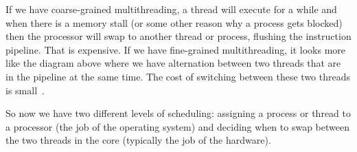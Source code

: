 If we have coarse-grained multithreading, a thread will execute for a while and when there is a memory stall (or some other reason why a process gets blocked) then the processor will swap to another thread or process, flushing the instruction pipeline. That is expensive. If we have fine-grained multithreading, it looks more like the diagram above where we have alternation between two threads that are in the pipeline at the same time. The cost of switching between these two threads is small~\cite{osc}.

So now we have two different levels of scheduling: assigning a process or thread to a processor (the job of the operating system) and deciding when to swap between the two threads in the core (typically the job of the hardware). 






